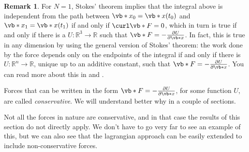 \documentclass[english,fontsize=11pt,paper=b5]{scrbook}
\theoremstyle{definition}
\newtheorem{remark}{Remark}[chapter]
\begin{document}
    \begin{remark}
      For $N=1$, Stokes' theorem implies that the integral above is independent from the path between $\vb*{x}_0 = \vb*{x}(t_0)$ and $\vb*{x}_1 = \vb*{x}(t_1)$ if and only if $\curl \vb*{F} = 0$, which in turn is true if and only if there is a $U:\mathbb{R}^3\to\mathbb{R}$ such that $\vb*{F} = -\frac{\partial U}{\partial \vb*{x}}$.
      In fact, this is true in any dimension by using the general version of Stokes' theorem: the work done by the force depends only on the endpoints of the integral if and only if there is $U:\mathbb{R}^n\to\mathbb{R}$, unique up to an additive constant, such that $\vb*{F} = -\frac{\partial U}{\partial \vb*{x}}$.
      You can read more about this in \cite[Chapter 2.5]{book:arnold} and \cite[Theorem 6.3 and 8.1]{book:knauf}.
    \end{remark}

    Forces that can be written in the form $\vb*{F} = -\frac{\partial U}{\partial \vb*{x}}$, for some function $U$, are called \emph{conservative}.
    We will understand better why in a couple of sections.

    Not all the forces in nature are conservative, and in that case the results of this section do not directly apply.
    We don't have to go very far to see an example of this, but we can also see that the lagrangian approach can be easily extended to include non-conservative forces.
\end{document}
